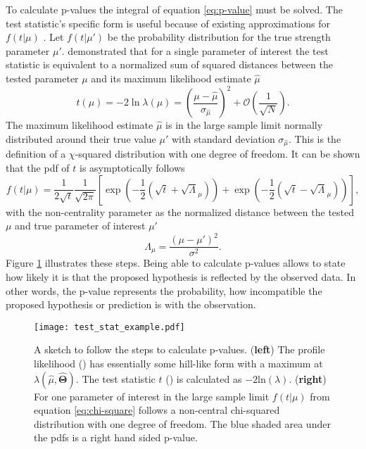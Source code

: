 To calculate p-values the integral of equation \ref{eq:p-value} must be solved. The test statistic's specific form is useful because of existing approximations for $f(t | \mu)$ \citep{cowan2011asymptotic}. Let $f(t | \mu')$ be the probability distribution for the true strength parameter $\mu'$. \citet{wald1943tests} demonstrated that for a single parameter of interest the test statistic is equivalent to a normalized sum of squared distances between the tested parameter $\mu$ and its maximum likelihood estimate $\hat{\mu}$
\begin{equation}
    t(\mu)=-2\ln \lambda(\mu)=
    \left(\frac{\mu-\hat{\mu}}{\sigma_{\hat{\mu}}} \right)^2
    + \mathcal{O}(\frac{1}{\sqrt{N}}).
\end{equation}
The maximum likelihood estimate $\hat{\mu}$ is in the large sample limit normally distributed around their true value $\mu'$ with standard deviation $\sigma_{\hat{\mu}}$. This is the definition of a $\chi$-squared distribution with one degree of freedom. It can be shown that \citep{cowan2011asymptotic} the \ac{pdf} of $t$ is  asymptotically follows
\begin{equation}\label{eq:chi-square}
    f(t | \mu)=\frac{1}{2\sqrt{t}}\frac{1}{\sqrt{2\pi}}
    \left[
        \exp\left(-\frac{1}{2}\left(\sqrt{t}+\sqrt{\Lambda}_\mu\right)\right)
        +
        \exp\left(-\frac{1}{2}\left(\sqrt{t}-\sqrt{\Lambda}_\mu\right)\right)
        \right],
\end{equation}
with the non-centrality parameter as the normalized distance between the tested $\mu$ and true parameter of interest $\mu'$
\begin{equation}
    \Lambda_\mu=\frac{(\mu-\mu')^2}{\sigma^2}.
\end{equation}
Figure \ref{fig:test_stat_example} illustrates these steps. Being able to calculate p-values allows to state how likely it is that the proposed hypothesis is reflected by the observed data. In other words, the p-value represents the probability, how incompatible the proposed hypothesis or prediction is with the observation.
\begin{figure}
    \centering
    \texttt{[image: test\_stat\_example.pdf]}
    \caption[]{A sketch to follow the steps to calculate p-values. (\textbf{left}) The profile likelihood ({\color[HTML]{1f77b4}{$\bm{\diagup}$}}) has essentially some hill-like form with a maximum at ${\lambda(\hat{\mu},\hat{\bm{\Theta}})}$. The test statistic $t$ ({\color[HTML]{ff7f0e}{$\bm{\diagup}$}}) is calculated as $-2\mathrm{ln}(\lambda)$. (\textbf{right}) For one parameter of interest in the large sample limit $f(t | \mu)$ from equation \ref{eq:chi-square} follows a non-central chi-squared distribution with one degree of freedom. The blue shaded area under the \acp{pdf} is a right hand sided p-value.}
    \label{fig:test_stat_example}
\end{figure}

